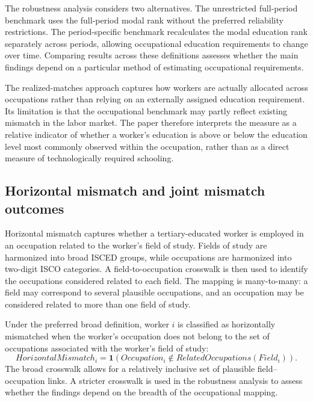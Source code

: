 The robustness analysis considers two alternatives. The unrestricted full-period benchmark uses the full-period modal rank without the preferred reliability restrictions. The period-specific benchmark recalculates the modal education rank separately across periods, allowing occupational education requirements to change over time. Comparing results across these definitions assesses whether the main findings depend on a particular method of estimating occupational requirements.

The realized-matches approach captures how workers are actually allocated across occupations rather than relying on an externally assigned education requirement. Its limitation is that the occupational benchmark may partly reflect existing mismatch in the labor market. The paper therefore interprets the measure as a relative indicator of whether a worker's education is above or below the education level most commonly observed within the occupation, rather than as a direct measure of technologically required schooling.

\subsection{Horizontal mismatch and joint mismatch outcomes}

Horizontal mismatch captures whether a tertiary-educated worker is employed in an occupation related to the worker's field of study. Fields of study are harmonized into broad ISCED groups, while occupations are harmonized into two-digit ISCO categories. A field-to-occupation crosswalk is then used to identify the occupations considered related to each field. The mapping is many-to-many: a field may correspond to several plausible occupations, and an occupation may be considered related to more than one field of study.

Under the preferred broad definition, worker $i$ is classified as horizontally mismatched when the worker's occupation does not belong to the set of occupations associated with the worker's field of study:
\begin{equation}
HorizontalMismatch_{i} = \mathbf{1}\left( Occupation_{i} \notin RelatedOccupations\left( Field_{i} \right) \right).
\end{equation}
The broad crosswalk allows for a relatively inclusive set of plausible field--occupation links. A stricter crosswalk is used in the robustness analysis to assess whether the findings depend on the breadth of the occupational mapping.

